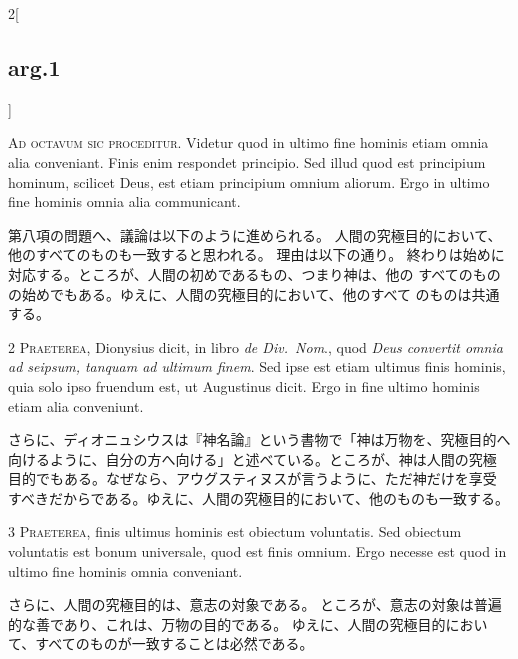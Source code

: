 \documentclass[paper=a4paper,fontsize=10pt,jafontsize=9pt,titlepage]{jlreq}
\begin{document}
\begin{paracol}{2}[\subsection{arg.1}]

{\Huge A}{\scshape d octavum sic proceditur}. Videtur quod
in ultimo fine hominis etiam omnia alia conveniant. Finis enim respondet
principio. Sed illud quod est principium hominum, scilicet Deus, est
etiam principium omnium aliorum. Ergo in ultimo fine hominis omnia alia
communicant.

\switchcolumn

第八項の問題へ、議論は以下のように進められる。
人間の究極目的において、他のすべてのものも一致すると思われる。
理由は以下の通り。
終わりは始めに対応する。ところが、人間の初めであるもの、つまり神は、他の
 すべてのものの始めでもある。ゆえに、人間の究極目的において、他のすべて
 のものは共通する。


{\scshape 2 Praeterea}, Dionysius dicit, in libro {\itshape de
Div.~Nom}., quod {\itshape Deus convertit omnia ad seipsum, tanquam ad ultimum
finem}. Sed ipse est etiam ultimus finis hominis, quia solo ipso fruendum
est, ut Augustinus dicit. Ergo in fine ultimo hominis etiam alia
conveniunt.

\switchcolumn

さらに、ディオニュシウスは『神名論』という書物で「神は万物を、究極目的へ
 向けるように、自分の方へ向ける」と述べている。ところが、神は人間の究極
 目的でもある。なぜなら、アウグスティヌスが言うように、ただ神だけを享受
 すべきだからである。ゆえに、人間の究極目的において、他のものも一致する。


{\scshape 3 Praeterea}, finis ultimus hominis est
obiectum voluntatis. Sed obiectum voluntatis est bonum universale, quod
est finis omnium. Ergo necesse est quod in ultimo fine hominis omnia
conveniant.

\switchcolumn

さらに、人間の究極目的は、意志の対象である。
ところが、意志の対象は普遍的な善であり、これは、万物の目的である。
ゆえに、人間の究極目的において、すべてのものが一致することは必然である。


\end{paracol}
\end{document}
